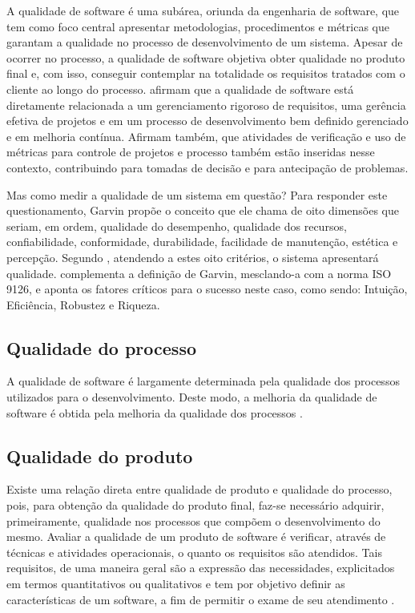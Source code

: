 \documentclass[tg]{mdtufsm}
\begin{document}
A qualidade de software é uma subárea, oriunda da engenharia de software, que tem como foco central apresentar metodologias,
procedimentos e métricas que garantam a qualidade no processo de desenvolvimento de um sistema. Apesar de ocorrer no processo, a qualidade de software
objetiva obter qualidade no produto final e, com isso, conseguir contemplar na totalidade os requisitos tratados com o cliente ao longo do processo.
\citeauthor{de2006introduccao} \cite{de2006introduccao} afirmam que a qualidade de software está diretamente relacionada a um gerenciamento
rigoroso de requisitos, uma gerência efetiva de projetos e em um processo de desenvolvimento bem definido gerenciado e em melhoria contínua. Afirmam também,
que atividades de verificação e uso de métricas para controle de projetos e processo também estão inseridas nesse contexto, contribuindo para tomadas de
decisão e para antecipação de problemas.

Mas como medir a qualidade de um sistema em questão? Para responder este questionamento, Garvin \cite{garvin1987competing} propõe o conceito que ele chama de
oito dimensões que seriam, em ordem, qualidade do desempenho, qualidade dos recursos, confiabilidade, conformidade, durabilidade, facilidade de manutenção,
estética e percepção. Segundo \citeauthor{garvin1987competing}, atendendo a estes oito critérios, o sistema apresentará qualidade.
\citeauthor{pressman2011engenharia} \cite{pressman2011engenharia} complementa a definição de Garvin, mesclando-a com a norma ISO 9126, e aponta os fatores
críticos para o sucesso neste caso, como sendo: Intuição, Eficiência, Robustez e Riqueza.

\subsection{Qualidade do processo}
A qualidade de software é largamente determinada pela qualidade dos processos utilizados para o desenvolvimento. Deste modo, a melhoria
da qualidade de software é obtida pela melhoria da qualidade dos processos \cite{koscianski2007qualidade}.

\subsection{Qualidade do produto}
Existe uma relação direta entre qualidade de produto e qualidade do processo, pois, para obtenção da qualidade do produto final,
faz-se necessário adquirir, primeiramente, qualidade nos processos que compõem o desenvolvimento do mesmo.
Avaliar a qualidade de um produto de software é verificar, através de técnicas e atividades operacionais, o quanto os requisitos são atendidos. Tais requisitos,
de uma maneira geral são a expressão das necessidades, explicitados em termos quantitativos ou qualitativos e tem por objetivo definir as características de
um software, a fim de permitir o exame de seu atendimento \cite{koscianski2007qualidade}.
\end{document}

